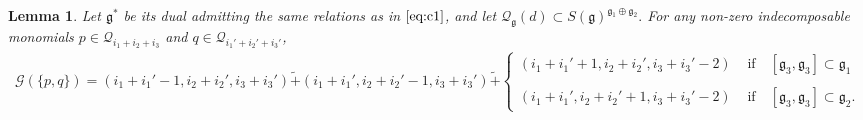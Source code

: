 \documentclass[10pt]{amsart}
\newtheorem{lemma}[theorem]{Lemma}
\theoremstyle{definition}
\theoremstyle{corollary}
\theoremstyle{remark}
\theoremstyle{conclusion}
\begin{document}
\begin{lemma}
\label{3.9}
  Let $\mathfrak{g}^*$ be its dual admitting the same relations as in $\eqref{eq:c1}$, and let $\mathcal{Q}_\mathfrak{g}(d) \subset S(\mathfrak{g})^{\mathfrak{g}_1 \oplus \mathfrak{g}_2 }.$ For any non-zero indecomposable monomials $p \in \mathcal{Q}_{i_1 + i_2  + i_3}$ and $q \in \mathcal{Q}_{i_1' + i_2' + i_3'}$,   \begin{align}
  \nonumber
   \mathcal{G} \left(\{p,q\}\right) =     (i_1+i_1'-1,i_2+i_2',i_3+i_3') \tilde{+}(i_1+i_1',i_2+i_2'-1,i_3+i_3') \tilde{+}    \left\{\begin{matrix}
(i_1+i_1'+1,i_2+i_2',i_3+i_3'-2)  & \text{ if } \text{ }  [\mathfrak{g}_3,\mathfrak{g}_3] \subset \mathfrak{g}_1 \\
        \\
         (i_1+i_1',i_2+i_2'+1,i_3+i_3'-2) & \text{ if }  \text{ } [\mathfrak{g}_3,\mathfrak{g}_3] \subset \mathfrak{g}_2.
    \end{matrix}\right.  \\
\end{align} %
 
\end{lemma}
\end{document}
